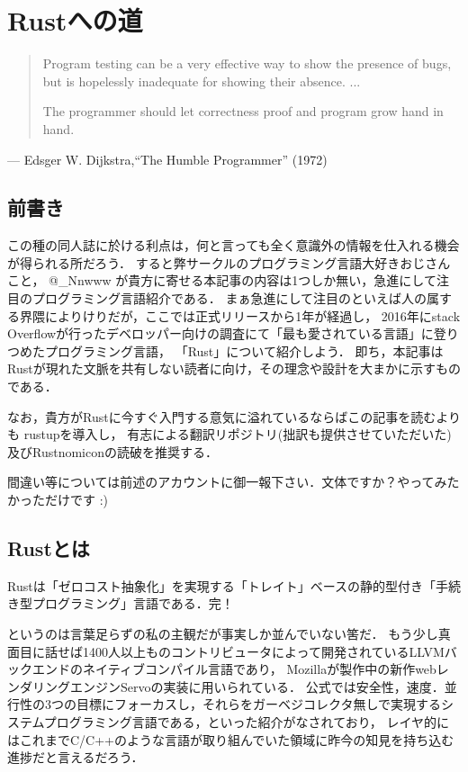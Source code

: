 \chapter{Rustへの道}
\begin{quotation}
  Program testing can be a very effective way to show the presence of bugs, \\
  but is hopelessly inadequate for showing their absence. ...

  The programmer should let correctness proof and program grow hand in hand.
\end{quotation}
\begin{flushright}
  --- Edsger W. Dijkstra,``The Humble Programmer'' (1972)
\end{flushright}

\section{前書き}
この種の同人誌に於ける利点は，何と言っても全く意識外の情報を仕入れる機会が得られる所だろう．
すると弊サークルのプログラミング言語大好きおじさんこと， @\_Nnwww が貴方に寄せる本記事の内容は1つしか無い，急進にして注目のプログラミング言語紹介である．
まぁ急進にして注目のといえば人の属する界隈によりけりだが，ここでは正式リリースから1年が経過し，
2016年にstack Overflowが行ったデベロッパー向けの調査にて「最も愛されている言語」に登りつめたプログラミング言語\cite{most_loved}，
「Rust」について紹介しよう．
即ち，本記事はRustが現れた文脈を共有しない読者に向け，その理念や設計を大まかに示すものである．

なお，貴方がRustに今すぐ入門する意気に溢れているならばこの記事を読むよりも
rustup\cite{rustup}を導入し，
有志による翻訳リポジトリ\cite{rustdoc_ja}(拙訳も提供させていただいた)及びRustnomicon\cite{nomicon}の読破を推奨する．

間違い等については前述のアカウントに御一報下さい．文体ですか？やってみたかっただけです :)

\section{Rustとは}
Rustは「ゼロコスト抽象化」を実現する「トレイト」ベースの静的型付き「手続き型プログラミング」言語である．完！

というのは言葉足らずの私の主観だが事実しか並んでいない筈だ．
もう少し真面目に話せば1400人以上ものコントリビュータによって開発されているLLVMバックエンドのネイティブコンパイル言語であり，
Mozillaが製作中の新作webレンダリングエンジンServoの実装に用いられている．
公式では安全性，速度．並行性の3つの目標にフォーカスし，それらをガーベジコレクタ無しで実現するシステムプログラミング言語である，といった紹介がなされており，
レイヤ的にはこれまでC/C++のような言語が取り組んでいた領域に昨今の知見を持ち込む進捗だと言えるだろう．

